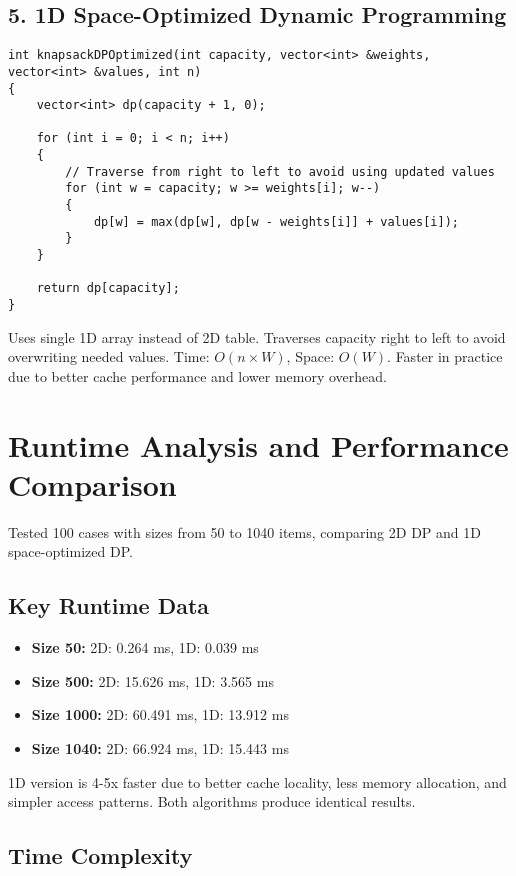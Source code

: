 \documentclass[12pt]{article}
\begin{document}
\newpage
\subsection*{5. 1D Space-Optimized Dynamic Programming}

\begin{lstlisting}
int knapsackDPOptimized(int capacity, vector<int> &weights, vector<int> &values, int n)
{
    vector<int> dp(capacity + 1, 0);

    for (int i = 0; i < n; i++)
    {
        // Traverse from right to left to avoid using updated values
        for (int w = capacity; w >= weights[i]; w--)
        {
            dp[w] = max(dp[w], dp[w - weights[i]] + values[i]);
        }
    }

    return dp[capacity];
}
\end{lstlisting}

Uses single 1D array instead of 2D table. Traverses capacity right to left to avoid overwriting needed values. Time: $O(n \times W)$, Space: $O(W)$. Faster in practice due to better cache performance and lower memory overhead.

\newpage
\section{Runtime Analysis and Performance Comparison}

Tested 100 cases with sizes from 50 to 1040 items, comparing 2D DP and 1D space-optimized DP.

\subsection*{Key Runtime Data}

\begin{itemize}
    \item \textbf{Size 50:} 2D: 0.264 ms, 1D: 0.039 ms
    \item \textbf{Size 500:} 2D: 15.626 ms, 1D: 3.565 ms
    \item \textbf{Size 1000:} 2D: 60.491 ms, 1D: 13.912 ms
    \item \textbf{Size 1040:} 2D: 66.924 ms, 1D: 15.443 ms
\end{itemize}

1D version is 4-5x faster due to better cache locality, less memory allocation, and simpler access patterns. Both algorithms produce identical results.

\subsection*{Time Complexity}
\end{document}
